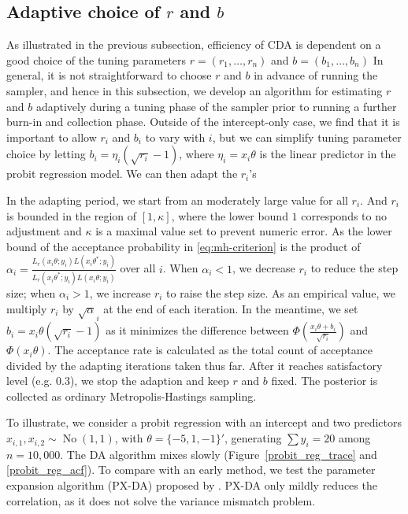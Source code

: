 \documentclass[10pt]{article}
\newcommand{\xbeta}{ x_i \theta}
\DeclareMathOperator{\No}{No}
\begin{document}
\subsection{Adaptive choice of $r$ and $b$}

As illustrated in the previous subsection, efficiency of CDA is dependent on a good choice of the tuning parameters $r=(r_1,\ldots,r_n)$ and $b=(b_1,\ldots,b_n)$
In general, it is not straightforward to choose $r$ and $b$ in advance of running the sampler, and hence in this subsection, we develop an algorithm for estimating $r$ and $b$ adaptively during a tuning phase of the sampler prior to running a further burn-in and collection phase.  Outside of the intercept-only case, we find that it is important to allow $r_i$ and $b_i$ to vary with $i$, but we can simplify tuning parameter choice by letting $b_i = \eta_i (\sqrt{r_i}-1)$, where $\eta_i = x_i\theta$ is the linear predictor in the probit regression model.  We can then adapt the $r_i$'s 





In the adapting period, we start from an moderately large value for all $r_i$. And  $r_i$ is bounded in the region of $[1, \kappa]$, where the lower bound $1$ corresponds to no adjustment and $\kappa$ is a maximal value set to prevent numeric error. As the lower bound of the acceptance probability in \eqref{eq:mh-criterion} is the product of  $\alpha_i= \frac{   L_r(\xbeta;y_i) L(\xbeta^*;y_i)}{ L_r(\xbeta^*;y_i)L(\xbeta;y_i) }$ over all $i$. When $\alpha_i<1$, we decrease $r_i$ to reduce the step size; when $\alpha_i>1$, we increase $r_i$ to raise the step size.  As an empirical value, we multiply $r_i$ by $\sqrt \alpha_i$ at the end of each iteration. In the meantime, we set $b_i= \xbeta (\sqrt{r_i}-1)$ as it minimizes the difference between $\Phi( \frac{\xbeta+b_i}{\sqrt{r_i}})$ and $\Phi(\xbeta)$. The acceptance rate is calculated as the total count of acceptance divided by the adapting iterations taken thus far. After it reaches satisfactory level (e.g. $0.3$), we stop the adaption and keep $r$ and $b$ fixed. The posterior is collected as ordinary Metropolis-Hastings sampling.

To illustrate, we consider a probit regression with an intercept and two predictors $x_{i,1},x_{i,2}\sim \No(1,1)$, with $\theta=\{-5,1,-1\}'$, generating $\sum y_i=20$ among $n=10,000$. The \cite{albert1993bayesian} DA algorithm mixes slowly (Figure~\ref{probit_reg_trace} and \ref{probit_reg_acf}). To compare with an early method, we test the parameter expansion algorithm (PX-DA) proposed by \cite{liu1999parameter}. PX-DA only mildly reduces the correlation, as it does not solve the variance mismatch problem.
\end{document}
